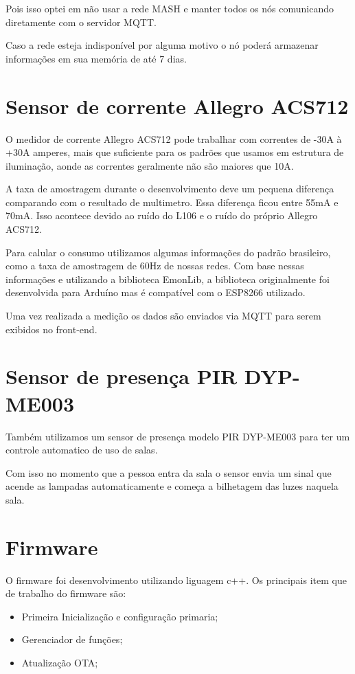 \documentclass[openright]{normas-utf-tex} %
\begin{document}
Pois isso optei em não usar a rede MASH e manter todos os nós comunicando diretamente com o servidor MQTT.

Caso a rede esteja indisponível por alguma motivo o nó poderá armazenar informações em sua memória de até 7 dias.

\section{Sensor de corrente Allegro ACS712}
O medidor de corrente Allegro ACS712  \cite{Allegro} pode trabalhar com correntes de -30A à +30A   \cite{Allegro} amperes, mais que suficiente para os padrões que usamos em estrutura de iluminação, aonde as correntes geralmente não são maiores que 10A.

A taxa de amostragem durante o desenvolvimento deve um pequena diferença comparando com o resultado de multimetro. Essa diferença ficou entre 55mA e 70mA. Isso acontece devido ao ruído do L106 e o ruído do próprio Allegro ACS712.

Para calular o consumo utilizamos algumas informações do padrão brasileiro, como a taxa de amostragem de 60Hz de nossas redes. Com base nessas informações e utilizando a biblioteca EmonLib, a biblioteca originalmente foi desenvolvida para Arduíno mas é compatível com o ESP8266 utilizado.

Uma vez realizada a medição os dados são enviados via MQTT   \cite{Novatec}para serem exibidos no front-end.

\section{Sensor de presença PIR DYP-ME003}

Também utilizamos um sensor de presença modelo PIR DYP-ME003   \cite{openimpulse}
para ter um controle automatico de uso de salas. 

Com isso no momento que a pessoa entra da sala o sensor envia um sinal que acende as lampadas automaticamente e começa a bilhetagem das luzes naquela sala.


\section{Firmware}

O firmware foi desenvolvimento utilizando liguagem c++. Os principais item que de trabalho do firmware são:


\begin{itemize}
    \item Primeira Inicialização e configuração primaria;
    \item Gerenciador de funções;
    \item Atualização OTA;
\end{itemize}
\end{document}
